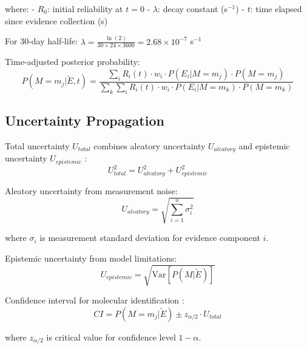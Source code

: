 where:
- $R_0$: initial reliability at $t = 0$
- $\lambda$: decay constant (s$^{-1}$)
- $t$: time elapsed since evidence collection (s)

For 30-day half-life: $\lambda = \frac{\ln(2)}{30 \times 24 \times 3600} = 2.68 \times 10^{-7}$ s$^{-1}$

Time-adjusted posterior probability:
\begin{equation}
P(M = m_j | \tilde{E}, t) = \frac{\sum_{i} R_i(t) \cdot w_i \cdot P(E_i | M = m_j) \cdot P(M = m_j)}{\sum_{k} \sum_{i} R_i(t) \cdot w_i \cdot P(E_i | M = m_k) \cdot P(M = m_k)}
\end{equation}

\subsection{Uncertainty Propagation}

Total uncertainty $U_{total}$ combines aleatory uncertainty $U_{aleatory}$ and epistemic uncertainty $U_{epistemic}$ \cite{helton2004alternative}:
\begin{equation}
U_{total}^2 = U_{aleatory}^2 + U_{epistemic}^2
\end{equation}

Aleatory uncertainty from measurement noise:
\begin{equation}
U_{aleatory} = \sqrt{\sum_{i=1}^n \sigma_i^2}
\end{equation}

where $\sigma_i$ is measurement standard deviation for evidence component $i$.

Epistemic uncertainty from model limitations:
\begin{equation}
U_{epistemic} = \sqrt{\text{Var}[P(M|\tilde{E})]}
\end{equation}

Confidence interval for molecular identification \cite{efron1993bootstrap}:
\begin{equation}
CI = P(M = m_j | \tilde{E}) \pm z_{\alpha/2} \cdot U_{total}
\end{equation}

where $z_{\alpha/2}$ is critical value for confidence level $1-\alpha$.
